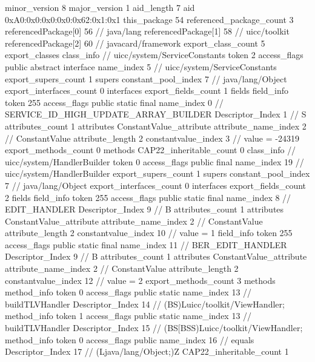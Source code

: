 {{{			minor_version	8
			major_version	1
			aid_length	7
			aid	0xA0:0x0:0x0:0x0:0x62:0x1:0x1
		}
	}
	this_package	54
	referenced_package_count	3
	referencedPackage[0]	56		// java/lang
	referencedPackage[1]	58		// uicc/toolkit
	referencedPackage[2]	60		// javacard/framework
	export_class_count	5
	export_classes {
		class_info {		// uicc/system/ServiceConstants
			token	2
			access_flags	public abstract interface
			name_index	5		// uicc/system/ServiceConstants
			export_supers_count	1
			supers {
				constant_pool_index	7		// java/lang/Object
			}
			export_interfaces_count	0
			interfaces {
			}
			export_fields_count	1
			fields {
			field_info {
				token	255
				access_flags	public static final
				name_index	0		// SERVICE_ID_HIGH_UPDATE_ARRAY_BUILDER
				Descriptor_Index	1		// S
				attributes_count	1
				attributes {
				ConstantValue_attribute {
					attribute_name_index	2		// ConstantValue
					attribute_length	2
					constantvalue_index	3		// value = -24319
				}
				}
			}
			}
			export_methods_count	0
			methods {
			}
			CAP22_inheritable_count	0
		}
		class_info {		// uicc/system/HandlerBuilder
			token	0
			access_flags	public final
			name_index	19		// uicc/system/HandlerBuilder
			export_supers_count	1
			supers {
				constant_pool_index	7		// java/lang/Object
			}
			export_interfaces_count	0
			interfaces {
			}
			export_fields_count	2
			fields {
			field_info {
				token	255
				access_flags	public static final
				name_index	8		// EDIT_HANDLER
				Descriptor_Index	9		// B
				attributes_count	1
				attributes {
				ConstantValue_attribute {
					attribute_name_index	2		// ConstantValue
					attribute_length	2
					constantvalue_index	10		// value = 1
				}
				}
			}
			field_info {
				token	255
				access_flags	public static final
				name_index	11		// BER_EDIT_HANDLER
				Descriptor_Index	9		// B
				attributes_count	1
				attributes {
				ConstantValue_attribute {
					attribute_name_index	2		// ConstantValue
					attribute_length	2
					constantvalue_index	12		// value = 2
				}
				}
			}
			}
			export_methods_count	3
			methods {
				method_info {
					token	0
					access_flags	public static
					name_index	13		// buildTLVHandler
					Descriptor_Index	14		// (BS)Luicc/toolkit/ViewHandler;
				}
				method_info {
					token	1
					access_flags	public static
					name_index	13		// buildTLVHandler
					Descriptor_Index	15		// (BS[BSS)Luicc/toolkit/ViewHandler;
				}
				method_info {
					token	0
					access_flags	public
					name_index	16		// equals
					Descriptor_Index	17		// (Ljava/lang/Object;)Z
				}
			}
			CAP22_inheritable_count	1
}}}
